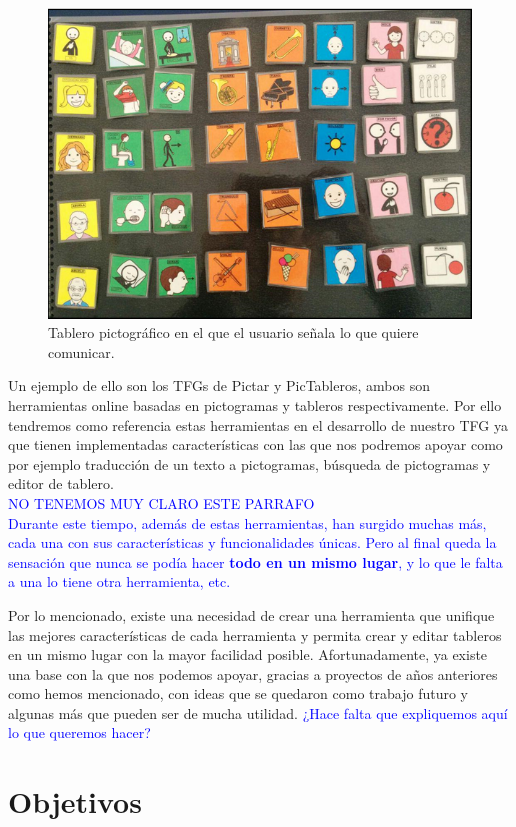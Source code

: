 \begin{figure}[h!]
	\centering
	\includegraphics[width=0.7\linewidth]{Imagenes/Bitmap/tablerofisico}
	\caption{Tablero pictográfico en el que el usuario señala lo que quiere comunicar.}
	\label{fig:tablerofisico}
\end{figure}




Un ejemplo de ello son los TFGs de Pictar y PicTableros, ambos son herramientas online basadas en pictogramas y tableros respectivamente. Por ello tendremos como referencia estas herramientas en el desarrollo de nuestro TFG ya que tienen implementadas características con las que nos podremos apoyar como por ejemplo traducción de un texto a pictogramas, búsqueda de pictogramas y editor de tablero.\\

\textcolor{blue} {NO TENEMOS MUY CLARO ESTE PARRAFO \\
	Durante este tiempo, además de estas herramientas, han surgido muchas más, cada una con sus características y funcionalidades únicas. Pero al final queda la sensación que nunca se podía hacer\textbf{ todo en un mismo lugar}, y lo que le falta a una lo tiene otra herramienta, etc.}

Por lo mencionado, existe una necesidad de crear una herramienta que unifique las mejores características de cada herramienta y permita crear y editar tableros en un mismo lugar con la mayor facilidad posible. Afortunadamente, ya existe una base con la que nos podemos apoyar, gracias a proyectos de años anteriores como hemos mencionado, con ideas que se quedaron como trabajo futuro y algunas más que pueden ser de mucha utilidad. \textcolor{blue}{¿Hace falta que expliquemos aquí lo que queremos hacer?}



\section{Objetivos}
\label{cap1:sec:Objetivos}

